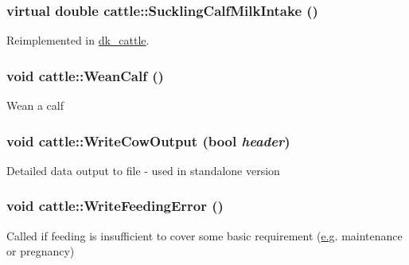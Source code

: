 \hypertarget{classcattle_ad2dd5d5a563d9b421d4c3cf46e563df3}{
\subsubsection[{SucklingCalfMilkIntake}]{\setlength{\rightskip}{0pt plus 5cm}virtual double cattle::SucklingCalfMilkIntake ()}}
\label{classcattle_ad2dd5d5a563d9b421d4c3cf46e563df3}


Reimplemented in \hyperlink{classdk__cattle_a448e3a99c61a223770c53dd023e1a9da}{dk\_\-cattle}.\hypertarget{classcattle_a680668c3ea07844f0dce5193f2f85b69}{
\subsubsection[{WeanCalf}]{\setlength{\rightskip}{0pt plus 5cm}void cattle::WeanCalf ()}}
\label{classcattle_a680668c3ea07844f0dce5193f2f85b69}
Wean a calf \hypertarget{classcattle_a66a96c0c6ec89204ed6b11b8393f8014}{
\subsubsection[{WriteCowOutput}]{\setlength{\rightskip}{0pt plus 5cm}void cattle::WriteCowOutput (bool {\em header})}}
\label{classcattle_a66a96c0c6ec89204ed6b11b8393f8014}
Detailed data output to file -\/ used in standalone version \hypertarget{classcattle_addc79a7896cb2c8207f26971cdd57d48}{
\subsubsection[{WriteFeedingError}]{\setlength{\rightskip}{0pt plus 5cm}void cattle::WriteFeedingError ()}}
\label{classcattle_addc79a7896cb2c8207f26971cdd57d48}
Called if feeding is insufficient to cover some basic requirement (\hyperlink{typer_8h_ae4c405e5c68c6ec2c44bb6d6adfc2f6ca35c0bb7088830963c73dcf0470ab8922}{e.g}. maintenance or pregnancy) 

